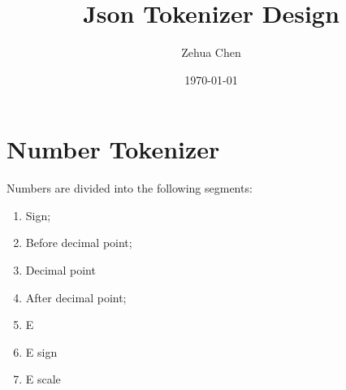 \documentclass[11pt, letterpaper]{article}
\title{Json Tokenizer Design}
\author{Zehua Chen}
\date{\today}
\begin{document}
  \maketitle

  \section{Number Tokenizer}

    Numbers are divided into the following segments:
    \begin{enumerate}
      \item Sign;
      \item Before decimal point;
      \item Decimal point
      \item After decimal point;
      \item E 
      \item E sign 
      \item E scale
    \end{enumerate}
\end{document}
